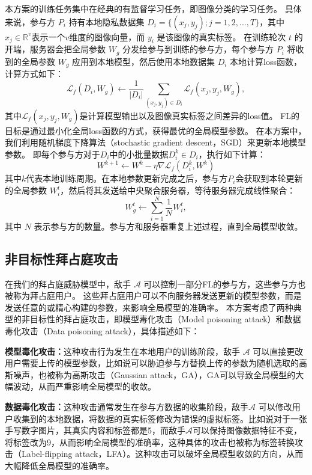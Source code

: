 本方案的训练任务集中在经典的有监督学习任务，即图像分类的学习任务。
具体来说，参与方 $P_i$ 持有本地隐私数据集 $D_i=\{(x_j, y_j);j=1,2,...,T\}$，其中$x_j\in\mathbb{R}^v$表示一个$v$维度的图像向量，而 $y_i$ 是该图像的真实标签。
在训练轮次 $t$ 的开端，服务器会把全局参数 $W_g$ 分发给参与到训练的参与方，每个参与方 $P_i$ 将收到的全局参数 $W_g$ 应用到本地模型，然后使用本地数据集 $D_i$ 本地计算loss函数，计算方式如下：
\begin{equation}
	\mathcal{L}_f(D_i, W_g) \leftarrow\frac{1}{|D_i|}\sum\limits_{(x_j,y_j)\in D_i}\mathcal{L}_f(x_j,y_j,W_g),
\end{equation}
其中$\mathcal{L}_f(x_j,y_j,W_g)$是计算模型输出以及图像真实标签之间差异的loss值。
FL的目标是通过最小化全局loss函数的方式，获得最优的全局模型参数。
在本方案中，我们利用随机梯度下降算法（stochastic gradient descent，SGD）来更新本地模型参数。
即每个参与方对于$D_i$中的小批量数据$D_i^k \in D_i$，执行如下计算：
\begin{equation}
	W^{k+1}\leftarrow W^{k}-\eta\nabla\mathcal{L}_f(D_i^k,W^k)
\end{equation}
其中$k$代表本地训练周期。在本地参数更新完成之后，参与方$P_i$会获取到本轮更新的全局参数 $W_i^t$，然后将其发送给中央聚合服务器，等待服务器完成线性聚合：
\begin{equation}
	W_g^{t}\leftarrow\sum_{i=1}^{N}\frac{1}{N}W_i^{t},
\end{equation}
其中 $N$ 表示参与方的数量。参与方和服务器重复上述过程，直到全局模型收敛。

\subsection{非目标性拜占庭攻击}
在我们的拜占庭威胁模型中，敌手 $\mathcal{A}$ 可以控制一部分FL的参与方，这些参与方也被称为拜占庭用户。
这些拜占庭用户可以不向服务器发送更新的模型参数，而是发送任意的或精心构建的参数，来影响全局模型的准确率。
本方案考虑了两种典型的非目标性的拜占庭攻击，即模型毒化攻击（Model poisoning attack）和数据毒化攻击（Data poisoning attack），具体描述如下：
\begin{compactitem}
	\item \textbf{模型毒化攻击：}这种攻击行为发生在本地用户的训练阶段，敌手 $\mathcal{A}$ 可以直接更改用户需要上传的模型参数，比如说可以胁迫参与方替换上传的参数为随机选取的高斯噪声，也被称为高斯攻击（Gaussian attack，GA）\cite{blanchard2017machine, dong2021flod}，GA可以导致全局模型的大幅波动，从而严重影响全局模型的收敛。
	\item  \textbf{数据毒化攻击：}这种攻击通常发生在参与方数据的收集阶段，敌手$\mathcal{A}$ 可以修改用户收集到的本地数据，将数据的真实标签修改为错误的虚拟标签。比如说对于一张手写数字图片，其真实内容和标签都是5，而敌手$\mathcal{A}$可以保持图像数据特征不变，将标签改为9，从而影响全局模型的准确率，这种具体的攻击也被称为标签转换攻击（Label-flipping attack，LFA）\cite{kairouz2019advances, dong2021flod, liu2021privacy}。这种攻击可以破坏全局模型收敛的方向，从而大幅降低全局模型的准确率。
\end{compactitem}

